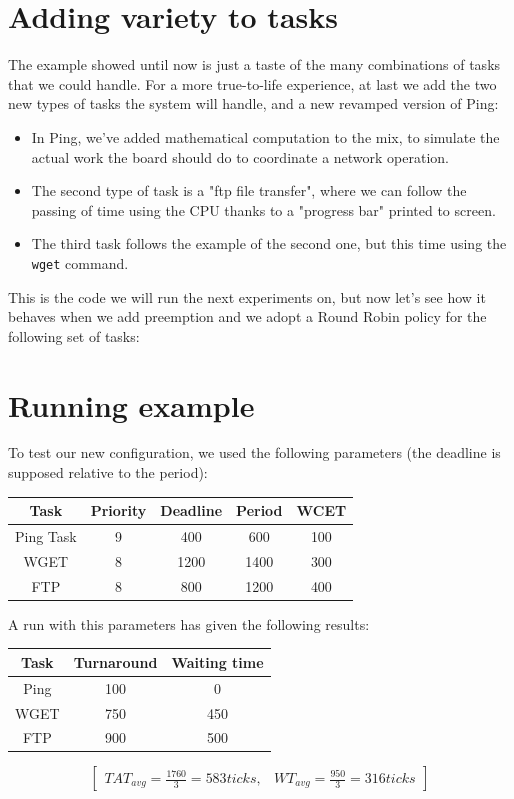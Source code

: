 \documentclass[10pt]{article}
\begin{document}
\section{Adding variety to tasks}
The example showed until now is just a taste of the many combinations of tasks that we could handle. For a more true-to-life experience, at last we add the two new types of tasks the system will handle, and a new revamped version of Ping:
\begin{itemize}
\item In Ping, we've added mathematical computation to the mix, to simulate the actual work the board should do to coordinate a network operation.
\item The second type of task is a "ftp file transfer", where we can follow the passing of time using the CPU thanks to a "progress bar" printed to screen.
\item The third task follows the example of the second one, but this time using the \verb|wget| command.
\end{itemize} 
This is the code we will run the next experiments on, but now let's see how it behaves when we add preemption and we adopt a Round Robin policy for the following set of tasks:
\section{Running example}
To test our new configuration, we used the following parameters (the deadline is supposed relative to the period):

\begin{center}
\begin{tabular}{|c||c|c|c|c|}
\hline 
\rule[-1ex]{0pt}{2.5ex} Task & Priority & Deadline & Period & WCET \\ 
\hline 
\rule[-1ex]{0pt}{2.5ex} Ping Task & 9 & 400 & 600 & 100 \\ 
\hline 
\rule[-1ex]{0pt}{2.5ex} WGET & 8 & 1200 & 1400 & 300 \\ 
\hline 
\rule[-1ex]{0pt}{2.5ex} FTP & 8 & 800 & 1200 & 400 \\ 
\hline 
\end{tabular}
\end{center}

A run with this parameters has given the following results:
\begin{center}
\begin{tabular}{|c|c|c|}
\hline 
\rule[-1ex]{0pt}{2.5ex} Task & Turnaround & Waiting time \\ 
\hline 
\rule[-1ex]{0pt}{2.5ex} Ping & 100 & 0 \\ 
\hline 
\rule[-1ex]{0pt}{2.5ex} WGET & 750 & 450 \\ 
\hline 
\rule[-1ex]{0pt}{2.5ex} FTP & 900 & 500 \\ 
\hline 
\end{tabular} 
\end{center}
\[\begin{bmatrix}
TAT_{avg}=\frac{1760}{3}=583ticks, & WT_{avg}=\frac{950}{3}=316ticks
\end{bmatrix}\]
\end{document}
